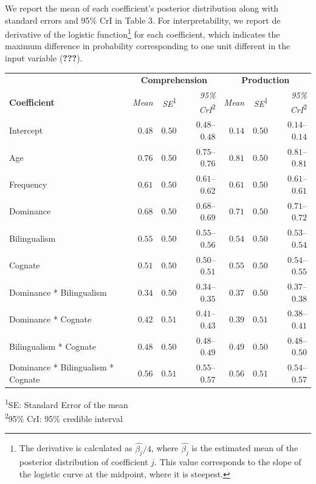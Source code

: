 \documentclass[
  english,
  man,man,floatsintext]{apa6}
\begin{document}
We report the mean of each coefficient's posterior distribution along with standard errors and 95\% CrI in Table 3. For interpretability, we report de derivative of the logistic function\footnote{The derivative is calculated as \(\hat{\beta_j}/4\), where \(\hat{\beta_j}\) is the estimated mean of the posterior distribution of coefficient \(j\). This value corresponds to the slope of the logistic curve at the midpoint, where it is steepest.} for each coefficient, which indicates the maximum difference in probability corresponding to one unit different in the input variable ({\textbf{???}}).

\captionsetup[table]{labelformat=empty,skip=1pt}
\begin{longtable}{lrrrrrr}
\toprule
& \multicolumn{3}{c}{\textbf{Comprehension}} & \multicolumn{3}{c}{\textbf{Production}} \\ 
 \cmidrule(lr){2-4}\cmidrule(lr){5-7}
\textbf{Coefficient} & \emph{Mean} & \emph{SE}\textsuperscript{1} & \emph{95\% CrI}\textsuperscript{2} & \emph{Mean} & \emph{SE}\textsuperscript{1} & \emph{95\% CrI}\textsuperscript{2} \\ 
\midrule
Intercept & $0.48$ & $0.50$ & $0.48$–$0.48$ & $0.14$ & $0.50$ & $0.14$–$0.14$ \\ 
Age & $0.76$ & $0.50$ & $0.75$–$0.76$ & $0.81$ & $0.50$ & $0.81$–$0.81$ \\ 
Frequency & $0.61$ & $0.50$ & $0.61$–$0.62$ & $0.61$ & $0.50$ & $0.61$–$0.61$ \\ 
Dominance & $0.68$ & $0.50$ & $0.68$–$0.69$ & $0.71$ & $0.50$ & $0.71$–$0.72$ \\ 
Bilingualism & $0.55$ & $0.50$ & $0.55$–$0.56$ & $0.54$ & $0.50$ & $0.53$–$0.54$ \\ 
Cognate & $0.51$ & $0.50$ & $0.50$–$0.51$ & $0.55$ & $0.50$ & $0.54$–$0.55$ \\ 
Dominance * Bilingualism & $0.34$ & $0.50$ & $0.34$–$0.35$ & $0.37$ & $0.50$ & $0.37$–$0.38$ \\ 
Dominance * Cognate & $0.42$ & $0.51$ & $0.41$–$0.43$ & $0.39$ & $0.51$ & $0.38$–$0.41$ \\ 
Bilingualism * Cognate & $0.48$ & $0.50$ & $0.48$–$0.49$ & $0.49$ & $0.50$ & $0.48$–$0.50$ \\ 
Dominance * Bilingualism * Cognate & $0.56$ & $0.51$ & $0.55$–$0.57$ & $0.56$ & $0.51$ & $0.54$–$0.57$ \\ 
\bottomrule
\end{longtable}
\vspace{-5mm}
\begin{minipage}{\linewidth}
\textsuperscript{1}SE: Standard Error of the mean \\ 
\textsuperscript{2}95\% CrI: 95\% credible interval \\ 
\end{minipage}
\end{document}
